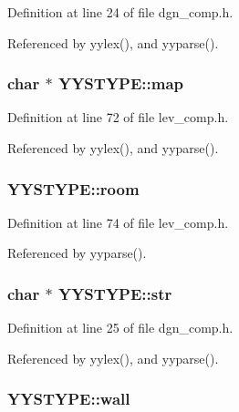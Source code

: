 Definition at line 24 of file dgn\+\_\+comp.\+h.



Referenced by yylex(), and yyparse().

\hypertarget{unionYYSTYPE_a14fe98d16d4d72e5a71858fb57f81275}{
\subsubsection[{map}]{\setlength{\rightskip}{0pt plus 5cm}char $\ast$ Y\+Y\+S\+T\+Y\+P\+E\+::map}}\label{unionYYSTYPE_a14fe98d16d4d72e5a71858fb57f81275}


Definition at line 72 of file lev\+\_\+comp.\+h.



Referenced by yylex(), and yyparse().

\hypertarget{unionYYSTYPE_a62b9dbce1487a64149e5610fb2743524}{
\subsubsection[{room}]{ Y\+Y\+S\+T\+Y\+P\+E\+::room}}\label{unionYYSTYPE_a62b9dbce1487a64149e5610fb2743524}


Definition at line 74 of file lev\+\_\+comp.\+h.



Referenced by yyparse().

\hypertarget{unionYYSTYPE_a5fdd8beefed5a63608bcbcd50aefd1b2}{
\subsubsection[{str}]{\setlength{\rightskip}{0pt plus 5cm}char $\ast$ Y\+Y\+S\+T\+Y\+P\+E\+::str}}\label{unionYYSTYPE_a5fdd8beefed5a63608bcbcd50aefd1b2}


Definition at line 25 of file dgn\+\_\+comp.\+h.



Referenced by yylex(), and yyparse().

\hypertarget{unionYYSTYPE_ae43d89063af0a4a05dfde06619d90e7e}{
\subsubsection[{wall}]{ Y\+Y\+S\+T\+Y\+P\+E\+::wall}}\label{unionYYSTYPE_ae43d89063af0a4a05dfde06619d90e7e}


